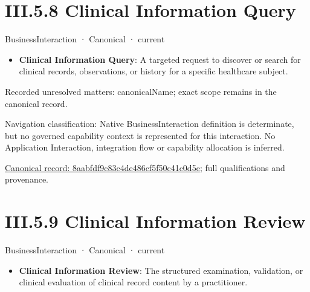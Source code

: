 \section*{III.5.8 Clinical Information Query}
\label{navigation:III.5.8}

\label{element:8aabfdf9c83c4de486cf5f50c41c0d5e}
{\small BusinessInteraction · Canonical · current}\par

\begin{itemize}


\item \textbf{Clinical Information Query}: A targeted request to discover or search for clinical records, observations, or history for a specific healthcare subject.

\end{itemize}

{\small Recorded unresolved matters: canonicalName; exact scope remains in the canonical record.}\par
{\small Navigation classification: Native BusinessInteraction definition is determinate, but no governed capability context is represented for this interaction. No Application Interaction, integration flow or capability allocation is inferred.}\par
{\footnotesize \href{../../../../../../../../continuum/business/business-interaction/8aabfdf9c83c4de486cf5f50c41c0d5e.md}{Canonical record: 8aabfdf9c83c4de486cf5f50c41c0d5e}; full qualifications and provenance.}\par
\section*{III.5.9 Clinical Information Review}
\label{navigation:III.5.9}

\label{element:06dbfdb6b8a84bd29f67ca955ba23006}
{\small BusinessInteraction · Canonical · current}\par

\begin{itemize}


\item \textbf{Clinical Information Review}: The structured examination, validation, or clinical evaluation of clinical record content by a practitioner.

\end{itemize}

